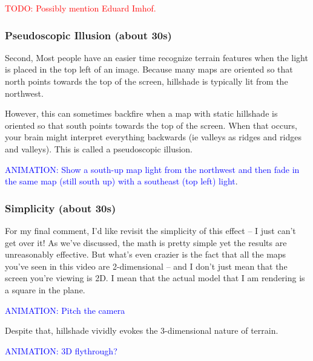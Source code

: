 \documentclass{article}
\newcommand\todo[1]{\textcolor{red}{TODO: #1}}
\newcommand\animation[1]{\textcolor{blue}{ANIMATION: #1}}
\begin{document}
\todo{Possibly mention Eduard Imhof.}

\subsubsection{Pseudoscopic Illusion (about 30s)}

Second, Most people have an easier time recognize terrain features when the light is placed in the top left of an image.
Because many maps are oriented so that north points towards the top of the screen, hillshade is typically lit from the northwest.

However, this can sometimes backfire when a map with static hillshade is oriented so that south points towards the top of the screen.
When that occurs, your brain might interpret everything backwards (ie valleys as ridges and ridges and valleys).
This is called a pseudoscopic illusion.

\animation{Show a south-up map light from the northwest and then fade in the same map (still south up) with a southeast (top left) light}.

\subsubsection{Simplicity (about 30s)}

For my final comment, I'd like revisit the simplicity of this effect -- I just can't get over it!
As we've discussed, the math is pretty simple yet the results are unreasonably effective.
But what's even crazier is the fact that all the maps you've seen in this video are 2-dimensional -- and I don't just mean that the screen you're viewing is 2D.
I mean that the actual model that I am rendering is a square in the plane.

\animation{Pitch the camera}

Despite that, hillshade vividly evokes the 3-dimensional nature of terrain.

\animation{3D flythrough?}
\end{document}
